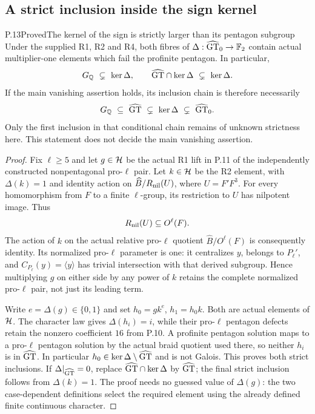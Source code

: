 \subsection{A strict inclusion inside the sign kernel}


\begin{statement}{P.13}{Proved}{The kernel of the sign is strictly larger than its pentagon subgroup}
Under the supplied R1, R2 and R4, both fibres of
$\Delta:\widehat{\mathrm{GT}}_0\to\mathbb F_2$ contain actual multiplier-one elements
which fail the profinite pentagon. In particular,
\[
 G_{\mathbb Q}\ \subsetneq\ \ker\Delta,
 \qquad
 \widehat{\mathrm{GT}}\cap\ker\Delta\ \subsetneq\ \ker\Delta.
\]
If the main vanishing assertion holds, its inclusion chain is
therefore necessarily
\[
 G_{\Q}\ \subseteq\ \GT\ \subsetneq\ \ker\Delta
                       \ \subsetneq\ \GZ.
\]
Only the first inclusion in that conditional chain remains of
unknown strictness here. This statement does not decide the
main vanishing assertion.
\end{statement}
\begin{proof}
Fix $\ell\ge5$ and let $g\in\mathcal H$ be the actual R1 lift in
P.11 of the independently constructed nonpentagonal
pro-$\ell$ pair. Let $k\in\mathcal H$ be the R2 element, with
$\Delta(k)=1$ and identity action on
$\widehat B/R_{\rm nil}(U)$, where $U=F'F^3$.
For every homomorphism from $F$ to a finite $\ell$-group,
its restriction to $U$ has nilpotent image. Thus
\[
 R_{\rm nil}(U)\subseteq O^\ell(F).
\]
The action of $k$ on the actual relative pro-$\ell$ quotient
$\widehat B/O^\ell(F)$ is consequently identity.
Its normalized pro-$\ell$ parameter is one: it centralizes
$y$, belongs to $P_\ell'$, and
$C_{P_\ell}(y)=\langle y\rangle$ has trivial intersection
with that derived subgroup. Hence multiplying $g$ on either
side by any power of $k$ retains the complete normalized
pro-$\ell$ pair, not just its leading term.

Write $e=\Delta(g)\in\{0,1\}$ and set
$h_0=gk^e$, $h_1=h_0k$. Both are actual elements of $\mathcal H$.
The character law gives $\Delta(h_i)=i$, while their
pro-$\ell$ pentagon defects retain the nonzero coefficient
$16$ from P.10. A profinite pentagon solution maps to a
pro-$\ell$ pentagon solution by the actual braid quotient
used there, so neither $h_i$ is in $\widehat{\mathrm{GT}}$.
In particular $h_0\in\ker\Delta\setminus\widehat{\mathrm{GT}}$ and is not
Galois. This proves both strict inclusions. If
$\Delta|_{\widehat{\mathrm{GT}}}=0$, replace $\widehat{\mathrm{GT}}\cap\ker\Delta$ by $\widehat{\mathrm{GT}}$;
the final strict inclusion follows from $\Delta(k)=1$.
The proof needs no guessed value of $\Delta(g)$: the two
case-dependent definitions select the required element
using the already defined finite continuous character.
\end{proof}
